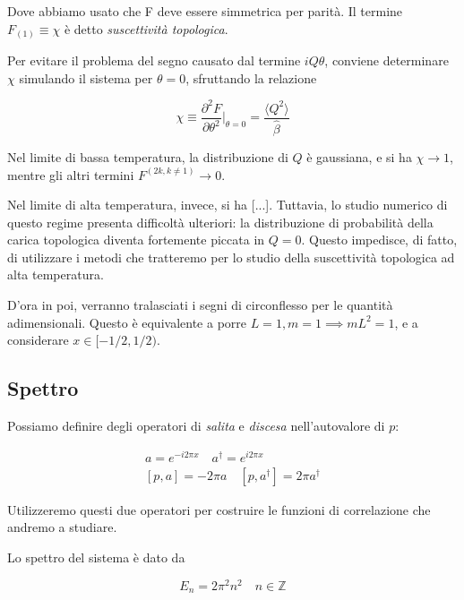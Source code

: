 \documentclass[a4paper,11pt]{article}
\newcommand{\avg}[1]{\langle {#1} \rangle}
\begin{document}
    Dove abbiamo usato che F deve essere simmetrica per parità. Il termine $F_{(1)} \equiv \chi$ è detto \emph{suscettività topologica}.
    
    Per evitare il problema del segno causato dal termine $iQ\theta$, conviene determinare $\chi$ simulando il sistema per $\theta = 0$, sfruttando la relazione
    
    \begin{equation}
        \chi \equiv \frac{\partial^2 F}{\partial \theta^2} \bigg\rvert_{\theta = 0} = \frac{\avg{Q^2}}{
        \hat{\beta}}
    \end{equation}
    
    Nel limite di bassa temperatura, la distribuzione di $Q$ è gaussiana, e si ha $\chi \to 1$, mentre gli altri termini $F^{(2k, k \neq 1)} \to 0$.
    
    Nel limite di alta temperatura, invece, si ha [...]. Tuttavia, lo studio numerico di questo regime presenta difficoltà ulteriori: la distribuzione di probabilità della carica topologica diventa fortemente piccata in $Q = 0$. Questo impedisce, di fatto, di utilizzare i metodi che tratteremo per lo studio della suscettività topologica ad alta temperatura.
    
    D'ora in poi, verranno tralasciati i segni di circonflesso per le quantità adimensionali. Questo è equivalente a porre $L=1, m = 1 \implies mL^2 = 1$, e a considerare $x \in [-1/2, 1/2)$.
    
    \subsection{Spettro}
    
    Possiamo definire degli operatori di \emph{salita} e \emph{discesa} nell'autovalore di $p$:
    
    \begin{eqnarray}
        a = e^{-i2\pi x} \quad a^\dagger = e^{i2\pi x} \\
        \left[p, a \right] = - 2\pi a \quad \left[p, a^\dagger \right] = 2 \pi a^\dagger
    \end{eqnarray}

    Utilizzeremo questi due operatori per costruire le funzioni di correlazione che andremo a studiare.
    
    Lo spettro del sistema è dato da
    
    \begin{equation}
        E_n = 2\pi^2 n^2 \quad n \in \mathbb{Z}
    \end{equation}
    
\end{document}

